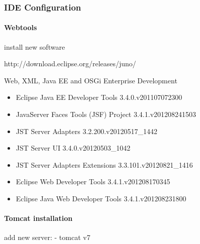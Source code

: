 \subsubsection{IDE Configuration} \label{sec:IDEConfiguration}

\paragraph{Webtools}
install new software

http://download.eclipse.org/releases/juno/ 

Web, XML, Java EE and OSGi Enterprise Development	
\begin{itemize}
	\item Eclipse Java EE Developer Tools	3.4.0.v201107072300
	\item JavaServer Faces Tools (JSF) Project	3.4.1.v201208241503
	\item JST Server Adapters	3.2.200.v20120517\_1442
	\item JST Server UI	3.4.0.v20120503\_1042
	\item JST Server Adapters Extensions	3.3.101.v20120821\_1416
	\item Eclipse Web Developer Tools	3.4.1.v201208170345
	\item Eclipse Java Web Developer Tools	3.4.1.v201208231800
\end{itemize} 
\paragraph{Tomcat installation}

add new server:
- tomcat v7

